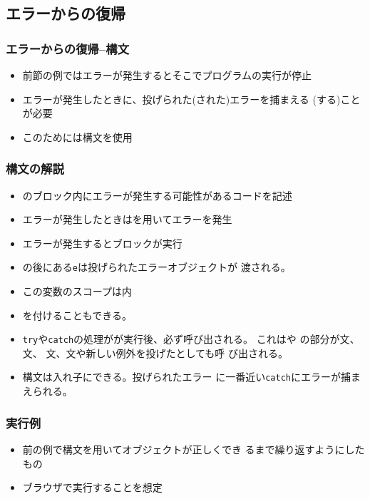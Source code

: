 \subsection{エラーからの復帰}
\begin{frame}[containsverbatim]
 \frametitle{エラーからの復帰--構文}
\begin{itemize}
 \item 前節の例ではエラーが発生するとそこでプログラムの実行が停止
 \item エラーが発生したときに、投げられた(された)エラーを捕まえる
(する)ことが必要
 \item このためには構文を使用
\end{itemize}
\end{frame}
\begin{frame}[containsverbatim]
 \frametitle{構文の解説}
 \begin{itemize}
 \item {}のブロック内にエラーが発生する可能性があるコードを記述
 \item エラーが発生したときはを用いてエラーを発生
 \item エラーが発生するとブロックが実行
	\item {}の後にある\texttt{e}は投げられたエラーオブジェクトが
				渡される。
	\item この変数のスコープは内
 \item {}を付けることもできる。
	\item \texttt{try}や\texttt{catch}の処理がが実行後、必ず呼び出される。
       これはや
       の部分が文、文、
       文、文や新しい例外を投げたとしても呼
       び出される。
 \item {}構文は入れ子にできる。投げられたエラー
			 に一番近い\texttt{catch}にエラーが捕まえられる。
 \end{itemize}
\end{frame}
\begin{frame}[containsverbatim]
 \frametitle{実行例}
\begin{itemize}
 \item   前の例で構文を用いてオブジェクトが正しくでき
	るまで繰り返すようにしたもの
 \item ブラウザで実行することを想定
\end{itemize}
\end{frame}
